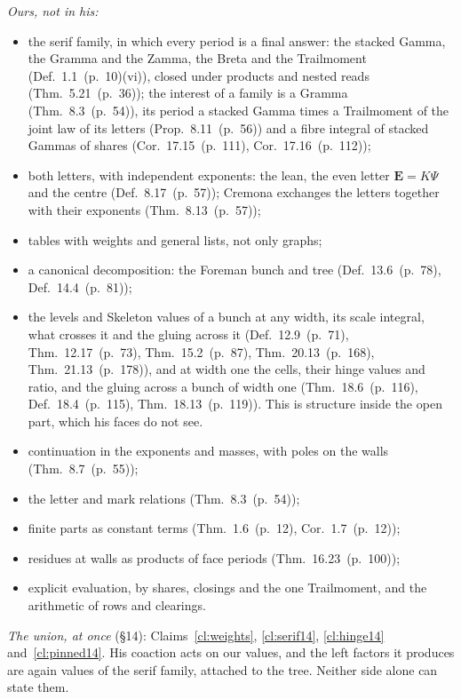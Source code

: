 \documentclass[11pt]{article}
\newcommand{\hb}[2]{#1~(p.~#2)}   %
\theoremstyle{plain}
\theoremstyle{remark}
\begin{document}
\emph{Ours, not in his:}
\begin{itemize}
\item the serif family, in which every period is a final answer: the stacked Gamma, the Gramma and the Zamma, the Breta and the Trailmoment (Def.~\hb{1.1}{10}(vi)), closed under products and nested reads (Thm.~\hb{5.21}{36}); the interest of a family is a Gramma (Thm.~\hb{8.3}{54}), its period a stacked Gamma times a Trailmoment of the joint law of its letters (Prop.~\hb{8.11}{56}) and a fibre integral of stacked Gammas of shares (Cor.~\hb{17.15}{111}, Cor.~\hb{17.16}{112});
\item both letters, with independent exponents: the lean, the even letter $\mathbf E=K\Psi$ and the centre (Def.~\hb{8.17}{57}); Cremona exchanges the letters together with their exponents (Thm.~\hb{8.13}{57});
\item tables with weights and general lists, not only graphs;
\item a canonical decomposition: the Foreman bunch and tree (Def.~\hb{13.6}{78}, Def.~\hb{14.4}{81});
\item the levels and Skeleton values of a bunch at any width, its scale integral, what crosses it and the gluing across it (Def.~\hb{12.9}{71}, Thm.~\hb{12.17}{73}, Thm.~\hb{15.2}{87}, Thm.~\hb{20.13}{168}, Thm.~\hb{21.13}{178}), and at width one the cells, their hinge values and ratio, and the gluing across a bunch of width one (Thm.~\hb{18.6}{116}, Def.~\hb{18.4}{115}, Thm.~\hb{18.13}{119}). This is structure inside the open part, which his faces do not see.
\item continuation in the exponents and masses, with poles on the walls (Thm.~\hb{8.7}{55});
\item the letter and mark relations (Thm.~\hb{8.3}{54});
\item finite parts as constant terms (Thm.~\hb{1.6}{12}, Cor.~\hb{1.7}{12});
\item residues at walls as products of face periods (Thm.~\hb{16.23}{100});
\item explicit evaluation, by shares, closings and the one Trailmoment, and the arithmetic of rows and clearings.
\end{itemize}

\emph{The union, at once} (\S14): Claims~\ref{cl:weights}, \ref{cl:serif14}, \ref{cl:hinge14} and~\ref{cl:pinned14}. His coaction acts on our values, and the left factors it produces are again values of the serif family, attached to the tree. Neither side alone can state them.
\end{document}

